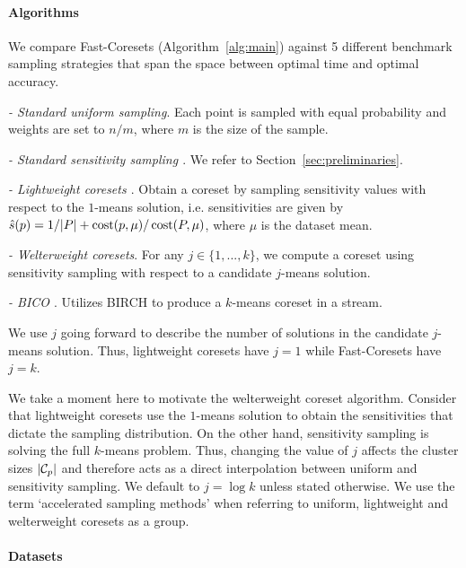 \paragraph*{Algorithms}
\label{ssec:algorithms}

We compare Fast-Coresets (Algorithm~\ref{alg:main}) against 5 different benchmark sampling strategies that span the space between optimal time and optimal
accuracy.
\begin{description}
        \item \emph{- Standard uniform sampling}. Each point is sampled with equal probability and weights are set to $n / m$, where $m$ is the size of the sample.
        \item \emph{- Standard sensitivity sampling \cite{LS10}}. We refer to Section~\ref{sec:preliminaries}.
        \item \emph{- Lightweight coresets \cite{bachem2018scalable}}. Obtain a coreset by sampling sensitivity values with respect to the $1$-means solution,
            i.e. sensitivities are given by $\hat{s}(p) = 1/|P| + \operatorname{cost}(p, \mu) / \operatorname{cost}(P, \mu)$, where $\mu$ is the dataset mean.
        \item \emph{- Welterweight coresets}. For any $j \in \{1,..., k\}$, we compute a coreset using sensitivity sampling with respect to a candidate
            $j$-means solution.
        \item \emph{- BICO \cite{bico}}. Utilizes BIRCH \cite{birch} to produce a $k$-means coreset in a stream.
\end{description}



We use $j$ going forward to describe the number of solutions in the candidate $j$-means solution. Thus, lightweight coresets have $j=1$ while Fast-Coresets have
$j=k$.

We take a moment here to motivate the welterweight coreset algorithm.  Consider that lightweight coresets use the $1$-means solution to obtain the sensitivities
that dictate the sampling distribution. On the other hand, sensitivity sampling is solving the full $k$-means problem. Thus, changing the value of $j$ affects
the cluster sizes $|\mathcal C_p|$ and therefore acts as a direct interpolation between uniform and sensitivity sampling.  We default to $j = \log k$ unless stated
otherwise. We use the term `accelerated sampling methods' when referring to uniform, lightweight and welterweight coresets as a group.

\paragraph*{Datasets}
\label{sssec:datasets}

